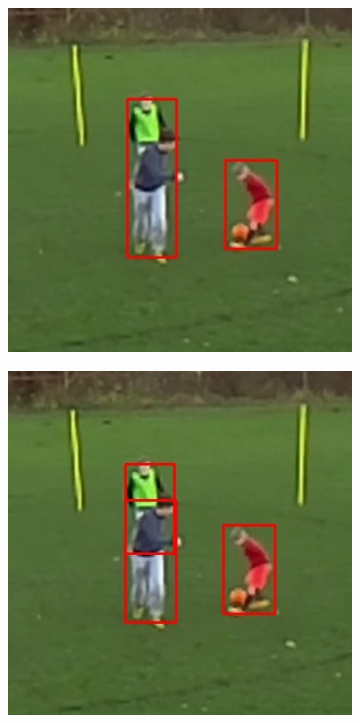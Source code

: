 \documentclass{article}
\begin{document}
\begin{figure}[h!]
\begin{subfigure}[b]{0.5\linewidth}
	\includegraphics[scale=0.4]{report/pic/3_new/off_seq_2.jpg} 
  \end{subfigure}
  \begin{subfigure}[b]{0.5\linewidth}
  \centering
	\includegraphics[scale=0.4]{report/pic/3_new/on_seq_2.jpg} 
  \end{subfigure}
    \begin{subfigure}[b]{0.5\linewidth}
  \centering

\end{subfigure}
\end{figure}
\end{document}
